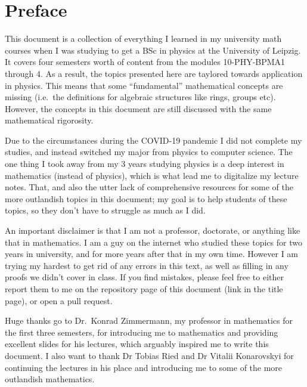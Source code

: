 \documentclass[../script.tex]{subfiles}
\begin{document}
    \chapter{Preface} 

    This document is a collection of everything I learned in my university math courses when I was studying to get a BSc in physics at the University of Leipzig.
    It covers four semesters worth of content from the modules 10-PHY-BPMA1 through 4.
    As a result, the topics presented here are taylored towards application in physics. This means that some ``fundamental'' mathematical concepts are missing (i.e.\ the definitions for algebraic structures like rings, groups etc).
    However, the concepts in this document are still discussed with the same mathematical rigorosity. 
    
    Due to the circumstances during the COVID-19 pandemic I did not complete my studies, and instead switched my major from physics to computer science.
    The one thing I took away from my 3 years studying physics is a deep interest in mathematics (instead of physics), which is what lead me to digitalize
    my lecture notes. That, and also the utter lack of comprehensive resources for some of the more outlandish topics in this document; my goal is to help
    students of these topics, so they don't have to struggle as much as I did.

    An important disclaimer is that I am not a professor, doctorate, or anything like that in mathematics. I am a guy on the internet who studied these topics
    for two years in university, and for more years after that in my own time. However I am trying my hardest to get rid of any errors in this text, as well
    as filling in any proofs we didn't cover in class. If you find mistakes, please feel free to either report them to me on the repository page of this document (link in the title page),
    or open a pull request.

    Huge thanks go to Dr.\ Konrad Zimmermann, my professor in mathematics for the first three semesters, for introducing me to mathematics and providing excellent slides
    for his lectures, which arguably inspired me to write this document. I also want to thank Dr Tobias Ried and Dr Vitalii Konarovskyi for continuing the lectures in his place
    and introducing me to some of the more outlandish mathematics.
\end{document}
